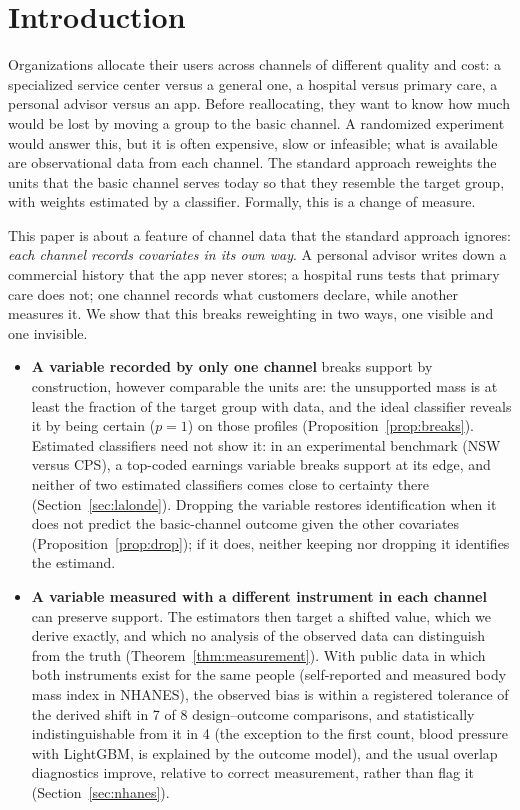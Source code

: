 \documentclass[twoside,11pt]{article}
\theoremstyle{plain}
\theoremstyle{definition}
\begin{document}
\section{Introduction}\label{sec:intro}

Organizations allocate their users across channels of different quality and cost: a specialized service center versus a general one, a hospital versus primary care, a personal advisor versus an app. Before reallocating, they want to know how much would be lost by moving a group to the basic channel. A randomized experiment would answer this, but it is often expensive, slow or infeasible; what is available are observational data from each channel. The standard approach reweights the units that the basic channel serves today so that they resemble the target group, with weights estimated by a classifier. Formally, this is a change of measure.

This paper is about a feature of channel data that the standard approach ignores: \emph{each channel records covariates in its own way}. A personal advisor writes down a commercial history that the app never stores; a hospital runs tests that primary care does not; one channel records what customers declare, while another measures it. We show that this breaks reweighting in two ways, one visible and one invisible.
\begin{itemize}
  \item \textbf{A variable recorded by only one channel} breaks support by construction, however comparable the units are: the unsupported mass is at least the fraction of the target group with data, and the ideal classifier reveals it by being certain ($p=1$) on those profiles (Proposition~\ref{prop:breaks}). Estimated classifiers need not show it: in an experimental benchmark (NSW versus CPS), a top-coded earnings variable breaks support at its edge, and neither of two estimated classifiers comes close to certainty there (Section~\ref{sec:lalonde}). Dropping the variable restores identification when it does not predict the basic-channel outcome given the other covariates (Proposition~\ref{prop:drop}); if it does, neither keeping nor dropping it identifies the estimand.
  \item \textbf{A variable measured with a different instrument in each channel} can preserve support. The estimators then target a shifted value, which we derive exactly, and which no analysis of the observed data can distinguish from the truth (Theorem~\ref{thm:measurement}). With public data in which both instruments exist for the same people (self-reported and measured body mass index in NHANES), the observed bias is within a registered tolerance of the derived shift in 7 of 8 design--outcome comparisons, and statistically indistinguishable from it in 4 (the exception to the first count, blood pressure with LightGBM, is explained by the outcome model), and the usual overlap diagnostics improve, relative to correct measurement, rather than flag it (Section~\ref{sec:nhanes}).
\end{itemize}
\end{document}
